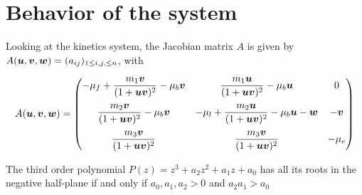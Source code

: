 \section{Behavior of the system}

Looking at the kinetics system, the Jacobian matrix $A$ is given by $A(\bm{u}, \bm{v}, \bm{w}) = (a_{ij})_{1 \le i, j, \le n}$, with

$$
A(\bm{u}, \bm{v}, \bm{w}) = \begin{pmatrix}  -\mu_f +  \dfrac{m_1\bm{v}}{(1+\bm{u} \bm{v})^2} - \mu_b \bm{v} &  \dfrac{m_1 \bm{u}}{(1+\bm{u} \bm{v})^2} - \mu_b \bm{u} & 0 \\[1.2em]
 \dfrac{m_2 \bm{v}}{(1+\bm{u} \bm{v})^2} - \mu_b \bm{v}   & -\mu_l + \dfrac{m_2 \bm{u}}{(1+\bm{u} \bm{v})^2} - \mu_b \bm{u} - \bm{w}  & -\bm{v} \\[1.2em] 
  \dfrac{m_3 \bm{v}}{(1+\bm{u} \bm{v})^2} &  \dfrac{m_3 \bm{v}}{(1+\bm{u} \bm{v})^2} & -\mu_e \end{pmatrix}
$$



\begin{lemma}
	The third order polynomial $P(z) = z^3 + a_2 z^2 + a_1 z + a_0$ has all its roots in the negative half-plane if and only if $a_0, a_1, a_2 > 0$ and $a_2 a_1 > a_0$
\end{lemma}


